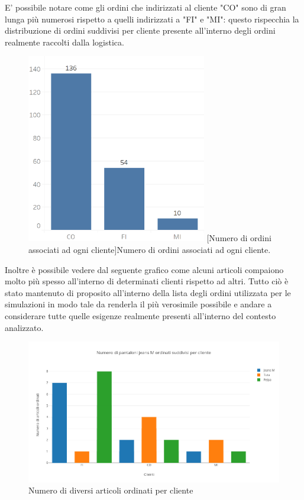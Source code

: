 \documentclass[12pt]{article}
\begin{document}
\noindent E' possibile notare come gli ordini che indirizzati al cliente "CO" sono di gran lunga più numerosi rispetto a quelli indirizzati a "FI" e "MI": questo rispecchia la distribuzione di ordini suddivisi per cliente presente all'interno degli ordini realmente raccolti dalla logistica.

\begin{figure}[H]
\centering
\includegraphics[width=0.7\textwidth,keepaspectratio]{Figures/Graphics/Orders_simulation.png}
[Numero di ordini associati ad ogni cliente]{Numero di ordini associati ad ogni cliente.}
\label{fig:OrdiniSimulazione}
\end{figure}

\noindent Inoltre è possibile vedere dal seguente grafico come alcuni articoli compaiono molto più spesso all'interno di determinati clienti rispetto ad altri. 
\noindent Tutto ciò è stato mantenuto di proposito all'interno della lista degli ordini utilizzata per le simulazioni in modo tale da renderla il più verosimile possibile e andare a considerare tutte quelle esigenze realmente presenti all'interno del contesto analizzato.

\begin{figure}[H]
\centering
\includegraphics[width=1\textwidth,keepaspectratio]{Figures/Graphics/articoli_clienti.png}
\caption[Numero di diversi articoli per cliente]{Numero di diversi articoli ordinati per cliente}
\label{fig:Electron}
\end{figure}
\end{document}
